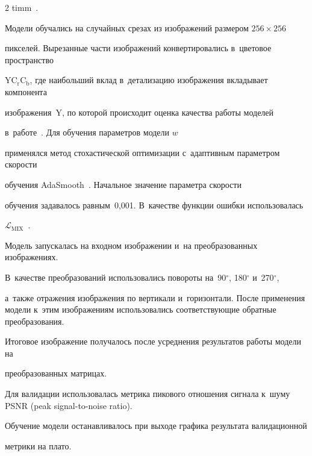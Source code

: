 \begin{multicols}{2}
timm~\cite{TIMMLIB}.





Модели обучались на случайных срезах из изоб\-ра\-же\-ний размером $256 \times 256$ 


пикселей. Вырезанные части изображений конвертировались в~цветовое пространство 


YC$_{\mathrm{r}}$C$_{\mathrm{b}}$, где наибольший вклад в~детализацию изображения вкладывает компонента 


изображения~Y, по которой происходит оценка качества работы моделей 


в~работе~\cite{UFORMER}. Для обучения параметров модели ${w}$ 


применялся метод стохастической оптимизации с~адаптивным параметром скорости 


обучения AdaSmooth~\cite{ADASMOOTH}. Начальное значение параметра ско\-рости 


обучения задавалось равным~0,001. В~качестве функции ошибки использовалась 


$\mathcal{L}_{\mathrm{MIX}}$~\cite{MIX_LOSS}.





Модель запускалась на входном изображении и~на преобразованных изображениях. 


В~качестве преобразований использовались повороты на~90$^\circ$, 180$^\circ$ и~270$^\circ$, 


а~также отражения изображения по вертикали и~горизонтали. После применения модели к~этим изображениям использовались соответствующие обратные преобразования. 


Итоговое изображение получалось после усреднения результатов работы модели на 


преобразованных матрицах.





Для валидации использовалась метрика пикового отношения сигнала к~шуму PSNR (peak signal-to-noise ratio). 


Обучение модели останавливалось при выходе графика результата валидационной 


метрики на плато.





\begin{figure}[b] %


\vspace*{1pt}



\end{figure}
\end{multicols}
